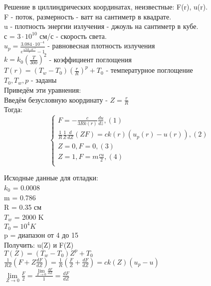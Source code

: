 Решение в циллиндрических координатах, неизвестные: F(r), u(r).\\
F - поток, размерность - ватт на сантиметр в квадрате.\\
u - плотность энергии излучения - джоуль на сантиметр в кубе.\\
с = $3 \cdot 10^{10}$ см/с - скорость света.\\
$u_{p} = \frac{3.084 \cdot 10^{-4}}{e^{\frac{4.709 \cdot 10^{+4}}{T}} - 1}$ - равновесная плотность излучения\\
$k = k_{0}(\frac{T}{300})^{2}$ - коэффициент поглощения\\
$T(r) = (T_{w} - T_{0})(\frac{r}{R})^{p} + T_{0}$ - температурное поглощение\\
$T_{0}, T_{w}, p$ - заданы\\

Приведём эти уравнения:\\
Введём безусловную координату - $Z = \frac{r}{R}$\\
Тогда:\\

\begin{equation}
\begin{cases}
F = -\frac{c}{3Rk(r)} \frac{du}{dz}, (1)\\
\frac{1}{R} \frac{1}{Z} \frac{d}{dZ} (ZF) = c k (r) (u_{p}(r) - u(r)), (2)\\
Z = 0, F = 0, (3)\\
Z = 1, F = m \frac{cu}{2}, (4)\\
\end{cases}
\end{equation}

Исходные данные для отладки:\\
$k_{0}$ = 0.0008\\
m = 0.786\\
R = 0.35 см\\
$T_{w}$ = 2000 K\\
$T_{0} = 10^{4} K$\\
p = диапазон от 4 до 15\\

Получить: u(Z) и F(Z)\\
$T(Z) = (T_{w} - T_{0})Z^{p} + T_{0}$\\
$\frac{1}{RZ}(F + Z \frac{dF}{dZ}) = \frac{1}{R}(\frac{F}{Z} + \frac{dF}{dZ}) = ck(Z)(u_{p} - u)$\\
$\lim\limits_{Z \rightarrow 0} \frac{F}{2} = \frac{\lim\limits_{Z \rightarrow 0} \frac{dF}{dZ}}{1} = \frac{dF}{dZ}$\\


